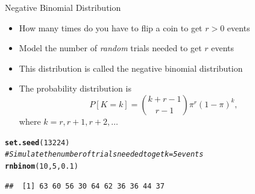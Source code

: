 \documentclass[xcolor=x11names,compress]{beamer}\usepackage[]{graphicx}\usepackage[]{color}
\makeatletter
\newcommand{\hlnum}[1]{\textcolor[rgb]{0.686,0.059,0.569}{#1}}%
\newcommand{\hlcom}[1]{\textcolor[rgb]{0.678,0.584,0.686}{\textit{#1}}}%
\newcommand{\hlstd}[1]{\textcolor[rgb]{0.345,0.345,0.345}{#1}}%
\newcommand{\hlkwd}[1]{\textcolor[rgb]{0.737,0.353,0.396}{\textbf{#1}}}%
\newenvironment{kframe}{%
 \def\at@end@of@kframe{}%
 \ifinner\ifhmode%
  \def\at@end@of@kframe{\end{minipage}}%
  \begin{minipage}{\columnwidth}%
 \fi\fi%
 \def\FrameCommand##1{\hskip\@totalleftmargin \hskip-\fboxsep
 \colorbox{shadecolor}{##1}\hskip-\fboxsep
     \hskip-\linewidth \hskip-\@totalleftmargin \hskip\columnwidth}%
 \MakeFramed {\advance\hsize-\width
   \@totalleftmargin\z@ \linewidth\hsize
   \@setminipage}}%
 {\par\unskip\endMakeFramed%
 \at@end@of@kframe}
\newenvironment{knitrout}{}{} %
\makeatother
\begin{document}
\begin{frame}[fragile]{Negative Binomial Distribution}
  \begin{itemize}
  \item How many times do you have to flip a coin to get
        $r>0$ events
  \item Model the number of {\it random} trials needed
        to get $r$ events
  \item This distribution is called the negative binomial distribution
  \item The probability distribution is
    \begin{equation*}
       P[K=k] = {k+r-1 \choose r-1} \pi^r (1-\pi)^{k},
    \end{equation*}
    where $k=r,r+1,r+2,\ldots$
 \end{itemize}
\begin{knitrout}\tiny
{}\color{fgcolor}\begin{kframe}
\begin{alltt}
\hlkwd{set.seed}\hlstd{(}\hlnum{13224}\hlstd{)}
\hlcom{# Simulate the number of trials needed to get k=5 events}
\hlkwd{rnbinom}\hlstd{(}\hlnum{10}\hlstd{,}\hlnum{5}\hlstd{,}\hlnum{0.1}\hlstd{)}
\end{alltt}
\begin{verbatim}
##  [1] 63 60 56 30 64 62 36 36 44 37
\end{verbatim}
\end{kframe}
\end{knitrout}
\end{frame}


\end{document}
